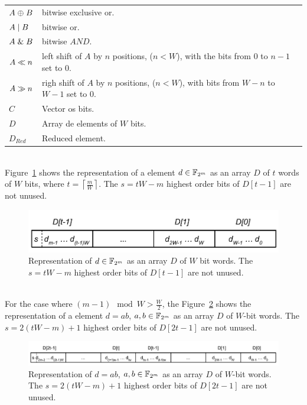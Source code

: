 \begin{tabular}{ll}
  $A \mathrel{\oplus} B$ & bitwise exclusive or. \\
  $A \mathrel{|} B$ & bitwise or. \\
  $A \mathrel{\&} B$     & bitwise $AND$. \\ 
  $A \ll n$     & left shift of $A$ by $n$ positions, ($n<W$), with the bits from 0 to $n-1$ set to $0$. \\
  $A\gg n$    & righ shift of $A$ by $n$ positions, ($n<W$), with bits from $W-n$ to $W-1$ set to $0$. \\
  $C$ & Vector os bits.\\
  $D$ & Array de elements of $W$ bits. \\
  $D_{Red}$ & Reduced element. \\
\end{tabular}\\

Figure~\ref{fig:elemento:field} shows the representation of a element $d \in {\mathbb F}_{2^m}$ as an array $D$ of $t$ words of $W$ bits, where $t = \left \lceil \frac{m}{W} \right \rceil$. The $s = tW-m$ highest order bits of $D[t-1]$ are not unused.
\begin{figure}[htb]
  \centering
  \includegraphics[width = .55\columnwidth]{figures/element-word.pdf}
\caption{Representation of $d \in {\mathbb F}_{2^m}$ as an array $D$ of $W$ bit words. The $s = tW-m$ highest order bits of $D[t-1]$ are not unused.}
\label{fig:elemento:field}
\end{figure}
\\

For the case where $(m-1) \mod{W} > \frac{W}{2}$, the Figure~\ref{fig:elemento:field:mult} shows the representation of a element $d = ab$, $a,b \in {\mathbb F}_{2^m}$ as an array $D$ of $W$-bit words. The $s = 2(tW-m)+1$ highest order bits of $D[2t-1]$ are not unused.

\begin{figure}[htb]
  \centering
  \includegraphics[width = .9\columnwidth]{figures/two-word-element-1.pdf}
\caption{Representation of $d = ab$, $a,b \in {\mathbb F}_{2^m}$ as an array $D$ of $W$-bit words. The $s = 2(tW-m)+1$ highest order bits of $D[2t-1]$ are not unused.}
\label{fig:elemento:field:mult}
\end{figure}


